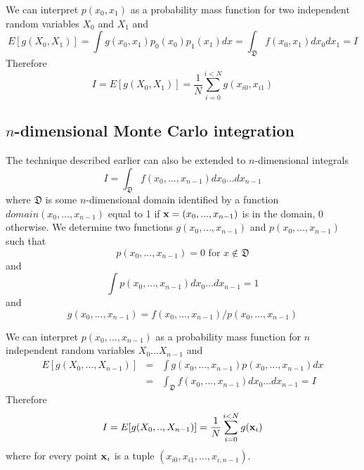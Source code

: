 \documentclass[justified, sixbynine]{tufte-book}
\theoremstyle{plain}%
\newtheorem * {corollary}{Corollary}
\theoremstyle{definition}
\theoremstyle{remark}
\newtheorem * {remark}{Remark}
\newtheorem * {note}{Note}
\begin{document}
\begin{fullwidth}
We can interpret $p(x_0, x_1)$ as a probability mass function for two
independent random variables $X_0$ and $X_1$ and
\begin{equation}
E[g(X_0, X_1)]=\int g(x_0, x_1)p_0(x_0)p_1(x_1)dx=\int_{{\mathfrak D}%
}f(x_0, x_1)dx_0dx_1=I
\end{equation}
Therefore
\begin{equation}
I = E[g(X_0, X_1)] = \frac 1N\sum_{i=0}^{i<N}g(x_{i0}, x_{i1})
\end{equation}

\goodbreak\subsection{$n$-dimensional Monte Carlo integration}

The technique described earlier can also be extended to $n$-dimensional integrals
\begin{equation}
I=\int_{{\mathfrak D}}f(x_0, ..., x_{n-1})dx_0...dx_{n-1}
\end{equation}
where ${\mathfrak D}$ is some $n$-dimensional domain identified by a function $%
domain(x_0, ..., x_{n-1})$ equal to 1 if ${\bf x}=(x_0, ..., x_{n-1})$ is in the
domain, 0 otherwise. We determine two functions $g(x_0, ..., x_{n-1})$ and $%
p(x_0, ..., x_{n-1})$ such that
\begin{equation}
p(x_0, ..., x_{n-1})=0\text{ for }x\notin {\mathfrak D}
\end{equation}
and
\begin{equation}
\int p(x_0, ..., x_{n-1})dx_0...dx_{n-1}=1
\end{equation}
and
\begin{equation}
g(x_0, ..., x_{n-1})=f(x_0, ..., x_{n-1})/p(x_0, ..., x_{n-1})
\end{equation}

We can interpret $p(x_0, ..., x_{n-1})$ as a probability mass function for $n$
independent random variables $X_0$...$X_{n-1}$ and
\begin{eqnarray}
E[g(X_0, ..., X_{n-1})] &=&\int g(x_0, ..., x_{n-1})p(x_0, ..., x_{n-1})dx \\
&=&\int_{{\mathfrak D}}f(x_0, ..., x_{n-1})dx_0...dx_{n-1}=I
\end{eqnarray}
Therefore
\begin{equation}
I=E[g(X_0, .., X_{n-1})] = \frac 1N\sum_{i=0}^{i<N}g({\bf x}_i)
\end{equation}
where for every point ${\bf x}_i$ is a tuple $(x_{i0}, x_{i1}, ..., x_{i, n-1})$.


\end{fullwidth}
\end{document}

